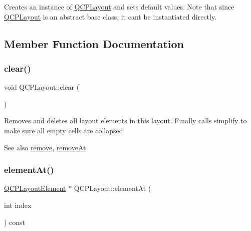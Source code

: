Creates an instance of \hyperlink{class_q_c_p_layout}{Q\+C\+P\+Layout} and sets default values. Note that since \hyperlink{class_q_c_p_layout}{Q\+C\+P\+Layout} is an abstract base class, it can\textquotesingle{}t be instantiated directly. 

\subsection{Member Function Documentation}
\hypertarget{class_q_c_p_layout_a02883bdf2769b5b227f0232dba1ac4ee}{}\label{class_q_c_p_layout_a02883bdf2769b5b227f0232dba1ac4ee} 
\subsubsection{\texorpdfstring{clear()}{clear()}}
{\footnotesize\ttfamily void Q\+C\+P\+Layout\+::clear (\begin{DoxyParamCaption}{ }\end{DoxyParamCaption})}

Removes and deletes all layout elements in this layout. Finally calls \hyperlink{class_q_c_p_layout_a41e6ac049143866e8f8b4964efab01b2}{simplify} to make sure all empty cells are collapsed.

\begin{DoxySeeAlso}{See also}
\hyperlink{class_q_c_p_layout_a6c58f537d8086f352576ab7c5b15d0bc}{remove}, \hyperlink{class_q_c_p_layout_a2403f684fee3ce47132faaeed00bb066}{remove\+At} 
\end{DoxySeeAlso}
\hypertarget{class_q_c_p_layout_afa73ca7d859f8a3ee5c73c9b353d2a56}{}\label{class_q_c_p_layout_afa73ca7d859f8a3ee5c73c9b353d2a56} 
\subsubsection{\texorpdfstring{element\+At()}{elementAt()}}
{\footnotesize\ttfamily \hyperlink{class_q_c_p_layout_element}{Q\+C\+P\+Layout\+Element} $\ast$ Q\+C\+P\+Layout\+::element\+At (\begin{DoxyParamCaption}\item[{int}]{index }\end{DoxyParamCaption}) const\hspace{0.3cm}{\ttfamily [pure virtual]}}


